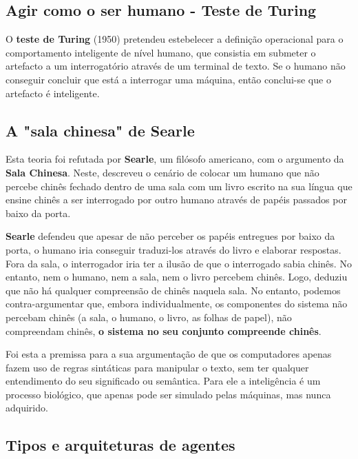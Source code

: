 \documentclass{article}
\begin{document}
\subsection{Agir como o ser humano - Teste de Turing}

O \textbf{teste de Turing} (1950) pretendeu estebelecer a definição operacional para o comportamento
inteligente de nível humano, que consistia em submeter o artefacto a um interrogatório através
de um terminal de texto. Se o humano não conseguir concluir que está a interrogar uma
máquina, então conclui-se que o artefacto é inteligente.

\subsection{A "sala chinesa" de Searle}

Esta teoria foi refutada por \textbf{Searle}, um filósofo americano, com o argumento da \textbf{Sala Chinesa}.
Neste, descreveu o cenário de colocar um humano que não percebe chinês fechado dentro de
uma sala com um livro escrito na sua língua que ensine chinês a ser interrogado por outro
humano através de papéis passados por baixo da porta.

\vspace{2mm}

\textbf{Searle} defendeu que apesar de não perceber os papéis entregues por baixo da porta, o
humano iria conseguir traduzi-los através do livro e elaborar respostas. Fora da sala, o
interrogador iria ter a ilusão de que o interrogado sabia chinês. No entanto, nem o humano, nem
a sala, nem o livro percebem chinês. Logo, deduziu que não há qualquer compreensão de
chinês naquela sala. No entanto, podemos contra-argumentar que,
embora individualmente, os componentes do sistema não percebam chinês
(a sala, o humano, o livro, as folhas de papel), não compreendam chinês,
\textbf{o sistema no seu conjunto compreende chinês}.

\vspace{2mm}

Foi esta a premissa para a sua argumentação de que os computadores apenas fazem uso de
regras sintáticas para manipular o texto, sem ter qualquer entendimento do seu significado ou
semântica. Para ele a inteligência é um processo biológico, que apenas pode ser simulado
pelas máquinas, mas nunca adquirido.

\pagebreak

\subsection{Tipos e arquiteturas de agentes}
\end{document}
